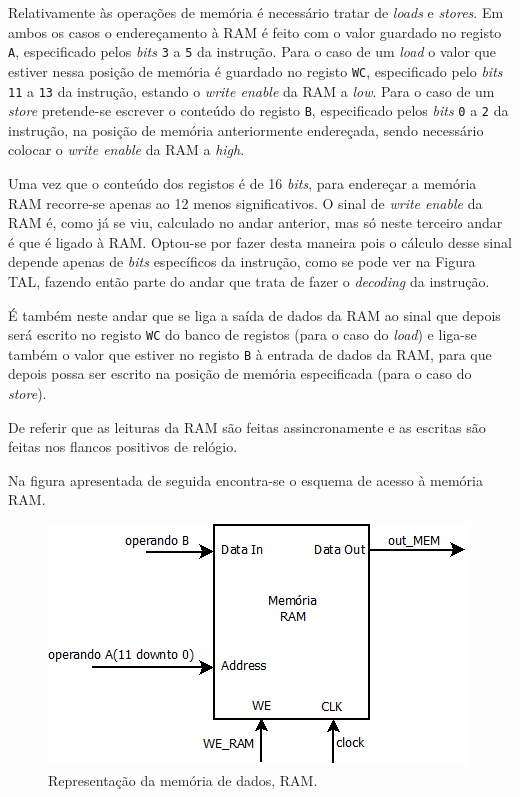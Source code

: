 \documentclass[11pt]{article}
\numberwithin{equation}{section}
\begin{document}
Relativamente às operações de memória é necessário tratar de \textit{loads} e \textit{stores}. Em ambos os casos o endereçamento à RAM é feito com o valor guardado no registo \texttt{A}, especificado pelos \textit{bits} \texttt{3} a \texttt{5} da instrução. Para o caso de um \textit{load} o valor que estiver nessa posição de memória é guardado no registo \texttt{WC}, especificado pelo \textit{bits} \texttt{11} a \texttt{13} da instrução, estando o \textit{write enable} da RAM a \textit{low}. Para o caso de um \textit{store} pretende-se escrever o conteúdo do registo \texttt{B}, especificado pelos \textit{bits} \texttt{0} a \texttt{2} da instrução, na posição de memória anteriormente endereçada, sendo necessário colocar o \textit{write enable} da RAM a \textit{high}. 

Uma vez que o conteúdo dos registos é de 16 \textit{bits}, para endereçar a memória RAM recorre-se apenas ao 12 menos significativos. O sinal de \textit{write enable} da RAM é, como já se viu, calculado no andar anterior, mas só neste terceiro andar é que é ligado à RAM. Optou-se por fazer desta maneira pois o cálculo desse sinal depende apenas de \textit{bits} específicos da instrução, como se pode ver na Figura TAL, fazendo então parte do andar que trata de fazer o \textit{decoding} da instrução.

É também neste andar que se liga a saída de dados da RAM ao sinal que depois será escrito no registo \texttt{WC} do banco de registos (para o caso do \textit{load}) e liga-se também o valor que estiver no registo \texttt{B} à entrada de dados da RAM, para que depois possa ser escrito na posição de memória especificada (para o caso do \textit{store}).

De referir que as leituras da RAM são feitas assincronamente e as escritas são feitas nos flancos positivos de relógio. 

Na figura apresentada de seguida encontra-se o esquema de acesso à memória RAM.

\begin{figure}[H]
	\centering
	\includegraphics[keepaspectratio=true, scale=0.40]{imagens/RAM}
	\caption{Representação da memória de dados, RAM.}
	\vspace{-0.8em}
\end{figure}
\end{document}
